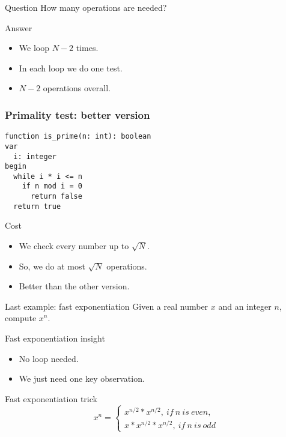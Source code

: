 \documentclass{beamer}
\begin{document}
\begin{frame}{Question}
  \justifying
  How many operations are needed?
\end{frame}

\begin{frame}{Answer}
\justifying
\begin{itemize}
  \item We loop $N-2$ times.
  \item In each loop we do one test.
  \item $N-2$ operations overall.
\end{itemize}
\end{frame}

\begin{frame}[fragile]
\frametitle{Primality test: better version}
\begin{verbatim}
function is_prime(n: int): boolean
var
  i: integer
begin
  while i * i <= n
    if n mod i = 0
      return false
  return true
\end{verbatim}
\end{frame}

\begin{frame}{Cost}
\justifying
\begin{itemize}
  \item We check every number up to $\sqrt{N}$.
  \item So, we do at most $\sqrt{N}$ operations.
  \item Better than the other version.
\end{itemize}
\end{frame}

\begin{frame}{Last example: fast exponentiation}
Given a real number $x$ and an integer $n$, compute $x^n$.
\end{frame}

\begin{frame}{Fast exponentiation insight}
\justifying
\begin{itemize}
  \item No loop needed.
  \item We just need one key observation.
\end{itemize}
\end{frame}

\begin{frame}{Fast exponentiation trick}
\[
  x^n= 
  \begin{cases}
    x^{n / 2} * x^{n / 2},\	if\ n\ is\ even,\\
    x * x^{n / 2} * x^{n / 2},\ if\ n\ is\ odd
  \end{cases}
\]
\end{frame}
\end{document}
